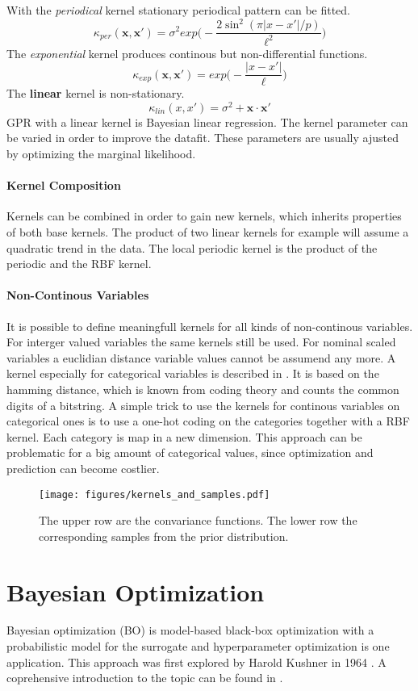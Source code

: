 \documentclass[english]{article}
\newcommand{\x}{\mathbf{x}}
\begin{document}
With the \textit{periodical} kernel stationary periodical pattern can be fitted.
$$\kappa_{per}(\x,\x') = \sigma^2exp\bigg(-\frac{2 \sin^2(\pi|x-x'|/p)}{\ell^2}\bigg)$$
The \textit{exponential} kernel produces continous but non-differential functions.
$$\kappa_{exp}(\x,\x') = exp\bigg(-\frac{|x-x'|}{\ell}\bigg)$$
The \textbf{linear} kernel is non-stationary.
$$\kappa_{lin}(x, x') = \sigma^2 + \x\cdot\x'$$
GPR with a linear kernel is Bayesian linear regression.
The kernel parameter can be varied in order to improve the datafit. These parameters are usually ajusted by optimizing the marginal likelihood.

\paragraph{Kernel Composition}
Kernels can be combined in order to gain new kernels, which inherits properties of both base kernels. The product of two linear kernels for example will assume a quadratic trend in the data. The local periodic kernel is the product of the periodic and the RBF kernel.

\paragraph{Non-Continous Variables}
It is possible to define meaningfull kernels for all kinds of  non-continous variables. For interger valued variables the same kernels still be used. For nominal scaled variables a euclidian distance variable values cannot be assumend any more. A kernel especially for categorical variables is described in \cite{hutter_sequential_2011}. It is based on the hamming distance, which is known from coding theory and counts the common digits of a bitstring. A simple trick to use the kernels for continous variables on categorical ones is to use a one-hot coding on the categories together with a RBF kernel. Each category is map in a new dimension. This approach can be problematic for a big amount of categorical values, since optimization and prediction can become costlier.

\begin{figure}
  \texttt{[image: figures/kernels\_and\_samples.pdf]}
  \caption{The upper row are the convariance functions. The lower row the corresponding samples from the prior distribution.}
  \label{kernels}
\end{figure}

\newpage


\section{Bayesian Optimization}
Bayesian optimization (BO) is model-based black-box optimization with a probabilistic model for the surrogate and hyperparameter optimization is one application. This approach was first explored by Harold Kushner in 1964 \cite{kushner_new_1964}. A coprehensive introduction to the topic can be found in \cite{shahriari_taking_2016}.
\end{document}
